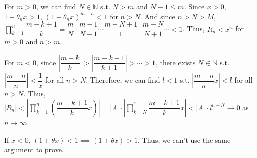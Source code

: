 \documentclass[12pt]{article}
\begin{document}
\begin{enumerate}
    For $m > 0$, we can find $N\in \mathbb{N}$ s.t. $N > m$ and $N-1 \leq m$.
    Since $x > 0$, $1 + \theta_n x > 1$, $(1+\theta_n x)^{m-n} < 1$ for $n > N$.
    And since $n > N > M$, $\displaystyle\prod_{k=1}^{n}\dfrac{m-k+1}{k} = \dfrac{m}{N} \cdot \dfrac{m-1}{N-1} \cdots \dfrac{m-N+1}{1} \cdot \dfrac{m-N}{N+1}\cdots < 1$.
    Thus, $R_n < x^n$ for $m > 0$ and $n > m$.
    
    For $m < 0$, since $|\dfrac{m-k}{k}| > |\dfrac{m-k-1}{k+1}| > \cdots > 1$,
    there exists $N\in \mathbb{N}$ s.t. $|\dfrac{m-n}{n}| < \dfrac{1}{x}$ for all $n > N$.
    Therefore, we can find $l < 1$ s.t. $|\dfrac{m-n}{n}x| < l$ for all $n > N$.
    Thus, $|R_n| < |\displaystyle\prod_{k=1}^{n} (\dfrac{m-k+1}{k}x)| = |A|\cdot |\displaystyle\prod_{k=N}^{^n} \dfrac{m-k+1}{k}x| < |A|\cdot l^{n-N} \to 0$ as $n\to\infty$.

    If $x < 0$, $(1 + \theta x) < 1\implies (1 +\theta x) > 1$.
    Thus, we can't use the same argument to prove.
\end{enumerate}
\end{document}
